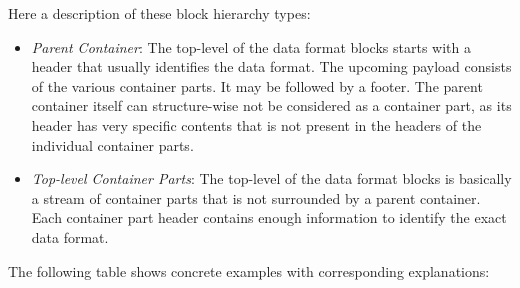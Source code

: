 Here a description of these block hierarchy types:
\begin{itemize}
	\item \emph{Parent Container}: The top-level of the data format blocks starts with a header that usually identifies the data format. The upcoming payload consists of the various container parts. It may be followed by a footer. The parent container itself can structure-wise not be considered as a container part, as its header has very specific contents that is not present in the headers of the individual container parts.
	\item \emph{Top-level Container Parts}: The top-level of the data format blocks is basically a stream of container parts that is not surrounded by a parent container. Each container part header contains enough information to identify the exact data format.
\end{itemize}

The following table shows concrete examples with corresponding explanations:


